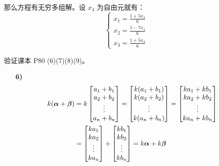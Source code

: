 \begin{problem}
\begin{solution}
\begin{enumerate}
			那么方程有无穷多组解。设 $x_4$ 为自由元就有：
			$$
			\begin{cases}
				x_1 = \frac{1 + 5x_4}{6} \\
				x_2 = \frac{1 - 7x_4}{6} \\
				x_3 = \frac{1 + 5x_4}{6}
			\end{cases}
			$$
		\end{enumerate}
	\end{solution}
\end{problem}

\begin{problem}
	验证课本 P80 (6)(7)(8)(9)。
	
	\begin{solution}
		\begin{enumerate}
			\item[\textbf{6)}]
			$$
			\begin{aligned}
				k(\boldsymbol{\alpha} + \boldsymbol{\beta})
				& = k \begin{bmatrix} a_1 + b_1 \\ a_2 + b_2 \\ \vdots \\ a_n+b_n \end{bmatrix}
				= \begin{bmatrix} k(a_1 + b_1) \\ k(a_2 + b_2) \\ \vdots \\ k(a_n + b_n) \end{bmatrix}
				= \begin{bmatrix} k a_1 + k b_1 \\ k a_2 + k b_2 \\ \vdots \\ k a_n + k b_n \end{bmatrix} \\
				& = \begin{bmatrix} k a_1 \\ k a_2 \\ \vdots \\ k a_n \end{bmatrix}
				+ \begin{bmatrix} k b_1 \\ k b_2 \\ \vdots \\ k b_n \end{bmatrix}
				= k \boldsymbol{\alpha} + k \boldsymbol{\beta} \\
			\end{aligned}
			$$


\end{enumerate}
\end{solution}
\end{problem}
